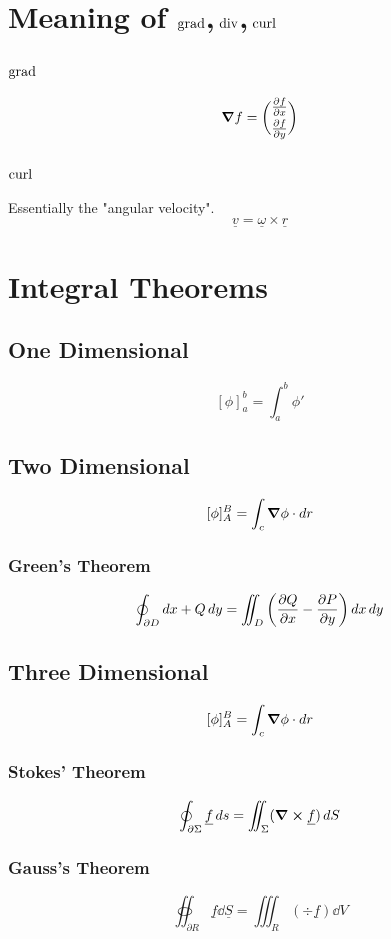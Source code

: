 \documentclass[00_complete]{subfiles}
\begin{document}
\section{Meaning of \texorpdfstring{$\operatorname{grad}$,$\;\operatorname{div}$,$\;\operatorname{curl}$}{grad, div, curl}}
\subsection{\texorpdfstring{$\operatorname{grad}$}{grad}}
$$\grad f = \binom{\pdv{f}{x}}{\pdv{f}{y}}$$
\subsection{\texorpdfstring{$\operatorname{curl}$}{curl}}
Essentially the "angular velocity".
$$\underline v = \underline \omega \times \underline r$$
\section{Integral Theorems}
\subsection{One Dimensional}
$$[\phi]_a^b=\int_{a}^{b}\phi'$$
\subsection{Two Dimensional}
$$[\phi]_A^B=\int_c\grad\phi \cdot \dd{r}$$
\subsubsection{Green's Theorem}
$$\oint_{\partial D}\dd{x}+Q\dd{y}=\iint_D\left(\pdv{Q}{x}-\pdv{P}{y}\right)\dd{x}\dd{y}$$

\subsection{Three Dimensional}
$$[\phi]_A^B=\int_c\grad\phi \cdot \dd{r}$$

\subsubsection{Stokes' Theorem}
$$\oint_{\partial \Sigma}\underline f \dd{s}=\iint_\Sigma(\curl \underline
f)\dd{S}$$

\subsubsection{Gauss's Theorem}
$$\oiint_{\partial R} \underline f \dd{\underline S} = \iiint_R (\div
\underline f)\dd{V}$$
\end{document}
